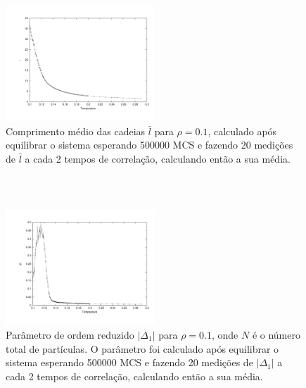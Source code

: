 \documentclass[11pt]{beamer}
\begin{document}
\begin{frame}
\frametitle{\insertsection \\ {\small \insertsubsection}}
\begin{figure}
	\centering
		\includegraphics[width=0.5\textwidth, clip, trim = 1.7cm 1.5cm 1cm 1cm]{images/0.1/l}
	\caption{{\footnotesize Comprimento médio das cadeias $\bar{l}$ para $\rho = 0.1$, calculado após equilibrar o sistema esperando 500000 MCS e fazendo 20 medições de $\bar{l}$ a cada 2 tempos de correlação, calculando então a sua média.}}
	\label{fig:9}
\end{figure}
\end{frame}

\begin{frame}
\frametitle{\insertsection \\ {\small \insertsubsection}}
\begin{figure}
	\centering
		\includegraphics[width=0.5\textwidth, clip, trim = 1.7cm 1.5cm 1cm 1cm]{images/0.1/d1}
	\caption{{\footnotesize Parâmetro de ordem reduzido $|\Delta_1|$ para $\rho = 0.1$, onde $N$ é o número total de partículas. O parâmetro foi calculado após equilibrar o sistema esperando 500000 MCS e fazendo 20 medições de $|\Delta_1|$ a cada 2 tempos de correlação, calculando então a sua média.}}
	\label{fig:10}
\end{figure}
\end{frame}
\end{document}
